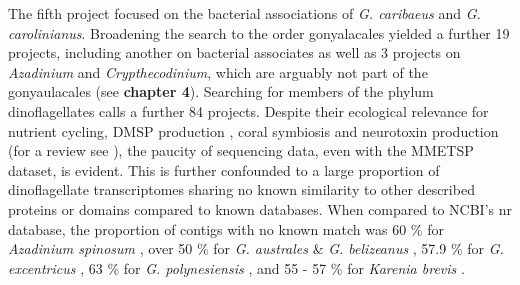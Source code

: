 \documentclass[12pt]{article}
\begin{document}
The fifth project focused on the bacterial associations of \textit{G. caribaeus} and \textit{G. carolinianus}.
Broadening the search to the order gonyalacales yielded a further 19 projects, including another on bacterial associates as well as 3 projects on \textit{Azadinium} and \textit{Crypthecodinium}, which are arguably not part of the gonyaulacales (see \textbf{chapter 4}). 
Searching for members of the phylum dinoflagellates calls a further 84 projects. 
Despite their ecological relevance for nutrient cycling, DMSP production , coral symbiosis and neurotoxin production (for a review see \cite{murray2016unravelling}), the paucity of sequencing data, even with the MMETSP dataset, is evident. 
This is further confounded to a large proportion of dinoflagellate transcriptomes sharing no known similarity to other described proteins or domains compared to known databases. 
When compared to NCBI's nr database, the proportion of contigs with no known match was 60 \% for \textit{Azadinium spinosum} \cite{meyer2015transcriptomic}, over 50 \% for \textit{G. australes} \& \textit{G. belizeanus} \cite{kohli2015polyketide}, 57.9 \% for \textit{G. excentricus} \cite{kohli2017role}, 63 \% for \textit{G. polynesiensis} \cite{kohli2017role,pawlowiez2014transcriptome}, and 55 - 57 \% for \textit{Karenia brevis} \cite{ryan2014novo}. 








\end{document}
